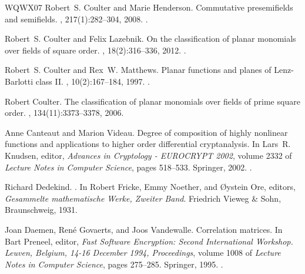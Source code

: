 \documentclass[12pt]{article}
\begin{document}
\begin{thebibliography}{WQWX07}
Robert~S. Coulter and Marie Henderson.
\newblock Commutative presemifields and semifields.
, 217(1):282--304, 2008.
\newblock \href {https://doi.org/10.1016/j.aim.2007.07.007}
  {}.

Robert~S. Coulter and Felix Lazebnik.
\newblock On the classification of planar monomials over fields of square
  order.
, 18(2):316--336, 2012.
\newblock \href {https://doi.org/10.1016/J.FFA.2011.09.002}
  {}.

Robert~S. Coulter and Rex~W. Matthews.
\newblock Planar functions and planes of {Lenz}-{Barlotti} class {II}.
, 10(2):167--184, 1997.
\newblock \href {https://doi.org/10.1023/A:1008292303803}
  {}.

Robert Coulter.
\newblock The classification of planar monomials over fields of prime square
  order.
, 134(11):3373--3378, 2006.

Anne Canteaut and Marion Videau.
\newblock Degree of composition of highly nonlinear functions and applications
  to higher order differential cryptanalysis.
\newblock In Lars~R. Knudsen, editor, {\em Advances in Cryptology - {EUROCRYPT}
  2002}, volume 2332 of {\em Lecture Notes in Computer Science}, pages
  518--533. Springer, 2002.
\newblock \href {https://doi.org/10.1007/3-540-46035-7_34}
  {}.

Richard Dedekind.
.
\newblock In Robert Fricke, Emmy Noether, and {\O}ystein Ore, editors, {\em
  {Gesammelte mathematische Werke, Zweiter Band}}. Friedrich Vieweg \& Sohn,
  Braunschweig, 1931.

Joan Daemen, Ren{\'{e}} Govaerts, and Joos Vandewalle.
\newblock Correlation matrices.
\newblock In Bart Preneel, editor, {\em Fast Software Encryption: Second
  International Workshop. Leuven, Belgium, 14-16 December 1994, Proceedings},
  volume 1008 of {\em Lecture Notes in Computer Science}, pages 275--285.
  Springer, 1995.
\newblock \href {https://doi.org/10.1007/3-540-60590-8_21}
  {}.


\end{thebibliography}
\end{document}
